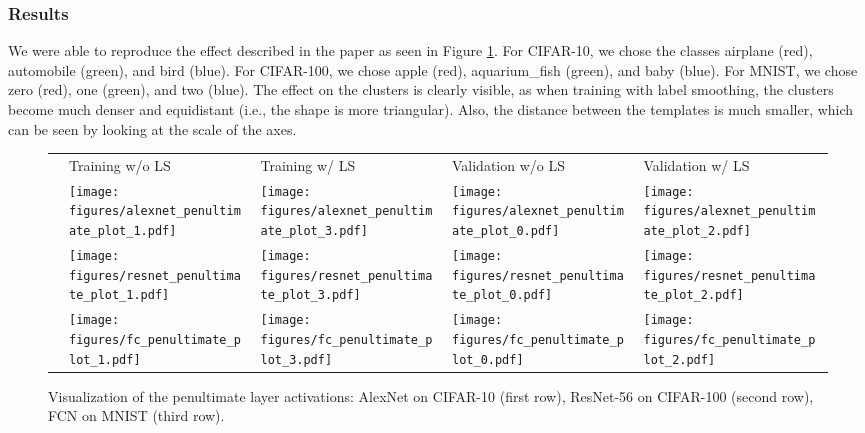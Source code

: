 
\subsubsection{Results}
We were able to reproduce the effect described in the paper as seen in Figure \ref{fig:pen}. For CIFAR-10, we chose the classes airplane ({\color{pl_red}red}), automobile ({\color{pl_green}green}), and bird ({\color{pl_blue}blue}). For CIFAR-100, we chose apple ({\color{pl_red}red}), aquarium\_fish ({\color{pl_green}green}), and baby ({\color{pl_blue}blue}). For MNIST, we chose zero ({\color{pl_red}red}), one ({\color{pl_green}green}), and two ({\color{pl_blue}blue}). The effect on the clusters is clearly visible, as when training with label smoothing, the clusters become much denser and equidistant (i.e., the shape is more triangular). Also, the distance between the templates is much smaller, which can be seen by looking at the scale of the axes.

\begin{figure}[ht]
\centering
        {\setlength{\tabcolsep}{0em}\begin{tabular}{m{.03\linewidth}*4{C}@{}}
        
             & Training w/o LS & Training w/ LS & Validation w/o LS & Validation w/ LS \\ 
            & \texttt{[image: figures/alexnet\_penultimate\_plot\_1.pdf]} 
            & \texttt{[image: figures/alexnet\_penultimate\_plot\_3.pdf]} 
            & \texttt{[image: figures/alexnet\_penultimate\_plot\_0.pdf]} 
            & \texttt{[image: figures/alexnet\_penultimate\_plot\_2.pdf]}\\ 
            & \texttt{[image: figures/resnet\_penultimate\_plot\_1.pdf]} 
            & \texttt{[image: figures/resnet\_penultimate\_plot\_3.pdf]} 
            & \texttt{[image: figures/resnet\_penultimate\_plot\_0.pdf]} 
            & \texttt{[image: figures/resnet\_penultimate\_plot\_2.pdf]}\\ 
            & \texttt{[image: figures/fc\_penultimate\_plot\_1.pdf]} 
            & \texttt{[image: figures/fc\_penultimate\_plot\_3.pdf]} 
            & \texttt{[image: figures/fc\_penultimate\_plot\_0.pdf]} 
            & \texttt{[image: figures/fc\_penultimate\_plot\_2.pdf]}\\ 
        \end{tabular}}
        
        \caption{Visualization of the penultimate layer activations: AlexNet on CIFAR-10 (first row), ResNet-56 on CIFAR-100 (second row), FCN on MNIST (third row).}
        \label{fig:pen}
\end{figure}


